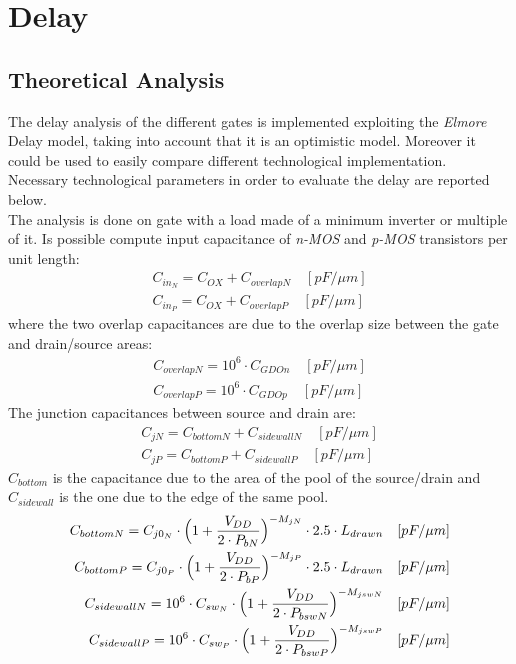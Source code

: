 \documentclass[12pt,  english, makeidx, a4paper, titlepage, oneside]{article}
\begin{document}
\newpage

\section{Delay}

\subsection{Theoretical Analysis}
\label{captech*}
The delay analysis of the different gates is implemented exploiting the \textit{Elmore} Delay model, taking into account that it is an optimistic model. Moreover it could be used to easily compare different technological implementation.\\
Necessary technological parameters in order to evaluate the delay are reported below.\\
The analysis is done on gate with a load made of a minimum inverter or multiple of it. Is possible compute input capacitance of \textit{n-MOS} and \textit{p-MOS} transistors per unit length:
\begin{eqnarray}
C_{in_N}=C_{OX}+C_{overlapN} \quad [pF/\mu m]\\
C_{in_P}=C_{OX}+C_{overlapP} \quad [pF/\mu m]
\end{eqnarray}
where the two overlap capacitances are due to the overlap size between the gate and drain/source areas:
\begin{eqnarray}
C_{overlapN}=10^6 \cdot C_{GDOn} \quad [pF/\mu m]\\
C_{overlapP}=10^6 \cdot C_{GDOp} \quad [pF/\mu m]
\end{eqnarray}
The junction capacitances between source and drain are:
\begin{eqnarray}
C_{jN}=C_{bottomN} + C_{sidewallN} \quad [pF/\mu m]\\
C_{jP}=C_{bottomP} + C_{sidewallP} \quad [pF/\mu m]
\end{eqnarray}
$C_{bottom}$ is the capacitance due to the area of the pool of the source/drain and $C_{sidewall}$ is the one due to the edge of the same pool.
\begin{eqnarray}
C_{bottomN}=C_{j0_N} \cdot \Bigl(1+ \frac{V_{DD}}{2 \cdot P_{bN}} \Bigr)^{-M_{jN}} \cdot 2.5 \cdot L_{drawn} \quad [pF/\mu m]\\
C_{bottomP}=C_{j0_P} \cdot \Bigl(1+ \frac{V_{DD}}{2 \cdot P_{bP}} \Bigr)^{-M_{jP}} \cdot 2.5 \cdot L_{drawn} \quad [pF/\mu m]\\
C_{sidewallN}=10^6 \cdot C_{sw_N} \cdot \Bigl(1+ \frac{V_{DD}}{2 \cdot P_{bswN}} \Bigr)^{-M_{jswN}} \quad [pF/\mu m]\\
C_{sidewallP}=10^6 \cdot C_{sw_P} \cdot \Bigl(1+ \frac{V_{DD}}{2 \cdot P_{bswP}} \Bigr)^{-M_{jswP}} \quad [pF/\mu m]
\end{eqnarray}
\end{document}
